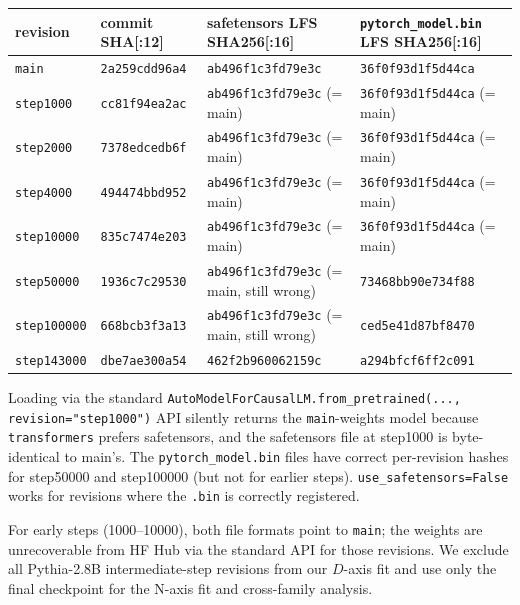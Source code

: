 \documentclass[10pt]{article}
\begin{document}
\begin{center}
\small
\begin{tabular}{llll}
\toprule
revision   & commit SHA[:12]  & safetensors LFS SHA256[:16] & \texttt{pytorch\_model.bin} LFS SHA256[:16] \\
\midrule
\texttt{main}        & \texttt{2a259cdd96a4} & \texttt{ab496f1c3fd79e3c} & \texttt{36f0f93d1f5d44ca} \\
\texttt{step1000}    & \texttt{cc81f94ea2ac} & \texttt{ab496f1c3fd79e3c} (= main) & \texttt{36f0f93d1f5d44ca} (= main) \\
\texttt{step2000}    & \texttt{7378edcedb6f} & \texttt{ab496f1c3fd79e3c} (= main) & \texttt{36f0f93d1f5d44ca} (= main) \\
\texttt{step4000}    & \texttt{494474bbd952} & \texttt{ab496f1c3fd79e3c} (= main) & \texttt{36f0f93d1f5d44ca} (= main) \\
\texttt{step10000}   & \texttt{835c7474e203} & \texttt{ab496f1c3fd79e3c} (= main) & \texttt{36f0f93d1f5d44ca} (= main) \\
\texttt{step50000}   & \texttt{1936c7c29530} & \texttt{ab496f1c3fd79e3c} (= main, still wrong) & \texttt{73468bb90e734f88} \\
\texttt{step100000}  & \texttt{668bcb3f3a13} & \texttt{ab496f1c3fd79e3c} (= main, still wrong) & \texttt{ced5e41d87bf8470} \\
\texttt{step143000}  & \texttt{dbe7ae300a54} & \texttt{462f2b960062159c} & \texttt{a294bfcf6ff2c091} \\
\bottomrule
\end{tabular}
\end{center}

Loading via the standard \verb|AutoModelForCausalLM.from_pretrained(...,|
\verb|revision="step1000")| API silently returns the \verb|main|-weights
model because \verb|transformers| prefers safetensors, and the
safetensors file at step1000 is byte-identical to main's. The
\verb|pytorch_model.bin| files have correct per-revision hashes for
step50000 and step100000 (but not for earlier steps).
\verb|use_safetensors=False| works for revisions where the
\verb|.bin| is correctly registered.

For early steps (1000--10000), both file formats point to \verb|main|;
the weights are unrecoverable from HF Hub via the standard API for
those revisions. We exclude all Pythia-2.8B intermediate-step
revisions from our $D$-axis fit and use only the final checkpoint
for the N-axis fit and cross-family analysis.
\end{document}
